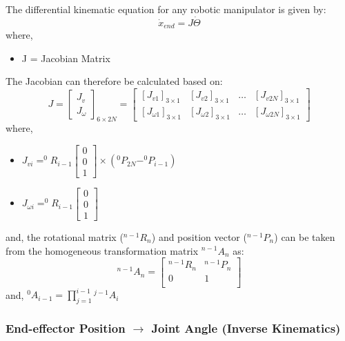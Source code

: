 \documentclass[a4paper,12pt]{report}
\begin{document}
The differential kinematic equation for any robotic manipulator is given by:
\begin{equation}
\dot{x}_{end}= J \dot{\Theta}
\label{forward-joint-end}
\end{equation}
where,
\begin{itemize}
	\renewcommand\labelitemi{--}
	\item J = Jacobian Matrix
\end{itemize}
The Jacobian can therefore be calculated based on:
\begin{equation*}
J=
\begin{bmatrix}
J_v \\
J_{\omega}
\end{bmatrix}_{6 \times 2N} = 
\begin{bmatrix}
[J_{v1}]_{3 \times 1} & [J_{v2}]_{3 \times 1} & \ldots & [J_{v2N}]_{3 \times 1} \\
[J_{\omega 1}]_{3 \times 1} & [J_{\omega 2}]_{3 \times 1} & \ldots & [J_{\omega 2N}]_{3 \times 1}
\end{bmatrix}
\end{equation*}
where, \\
\begin{itemize}
	\renewcommand\labelitemi{--}
	\item $ J_{vi}= ^{0}R_{i-1} \begin{bmatrix} 0\\ 0\\ 1\end{bmatrix} \times (^{0}P_{2N} - ^{0}P_{i-1}) $
	\vspace{1mm}
	\item $ J_{\omega i}= ^{0}R_{i-1}\begin{bmatrix} 0\\ 0\\ 1\end{bmatrix} $
\end{itemize}
and, the rotational matrix ($^{n-1}R_{n}$) and position vector ($^{n-1}P_{n}$) can be taken from the homogeneous transformation matrix $^{n-1}A_{n}$ as:
\begin{equation*}
^{n-1}A_{n}=
\begin{bmatrix}
^{n-1}R_{n} & ^{n-1}P_{n} \\
0 & 1 \\
\end{bmatrix}
\end{equation*}
and, $^0A_{i-1}=\prod^{i-1}_{j=1} {}^{j-1}A_{i}$

\subsubsection{End-effector Position \textbf{$\longrightarrow$} Joint Angle (Inverse Kinematics)}
\end{document}
